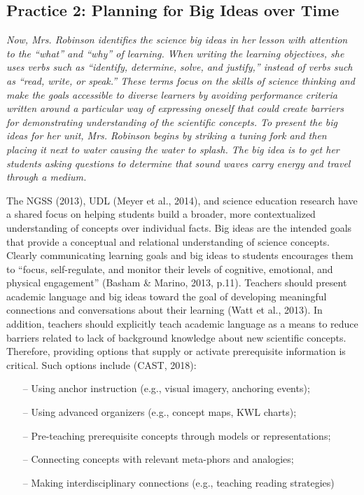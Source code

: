 \documentclass[11.5pt]{sig-alternate}
\begin{document}
\begin{large}
\subsection*{Practice 2: Planning for Big Ideas over Time}

\textit{Now, Mrs. Robinson identifies the science big ideas in her lesson with attention to the “what” and “why” of learning. When writing the learning objectives, she uses verbs such as “identify, determine, solve, and justify,” instead of verbs such as “read, write, or speak.” These terms focus on the skills of science thinking and make the goals accessible to diverse learners by avoiding performance criteria written around a particular way of expressing oneself that could create barriers for demonstrating understanding of the scientific concepts. To present the big ideas for her unit, Mrs. Robinson begins by striking a tuning fork and then placing it next to water causing the water to splash. The big idea is to get her students asking questions to determine that sound waves carry energy and travel through a medium.}
	
 The NGSS (2013), UDL (Meyer et al., 2014), and science education research have a shared focus on helping students build a broader, more contextualized understanding of concepts over individual facts. Big ideas are the intended goals that provide a conceptual and relational understanding of science concepts. Clearly communicating learning goals and big ideas to students encourages them to “focus, self-regulate, and monitor their levels of cognitive, emotional, and physical engagement” (Basham \& Marino, 2013, p.11). Teachers should present academic language and big ideas toward the goal of developing meaningful connections and conversations about their learning (Watt et al., 2013). In addition, teachers should explicitly teach academic language as a means to reduce barriers related to lack of background knowledge about new scientific concepts. Therefore, providing options that supply or activate prerequisite information is critical. Such options include (CAST, 2018): 

\begin{itemize}
\item   [--]Using anchor instruction (e.g., visual imagery, anchoring events);
\item   [--]Using advanced organizers (e.g., concept maps, KWL charts);
\item 	[--]Pre-teaching prerequisite concepts through models or representations;
\item 	[--]Connecting concepts with relevant meta-phors and analogies;
\item 	[--]Making interdisciplinary connections (e.g., teaching reading strategies)
\end{itemize}


\end{large}
\end{document}

